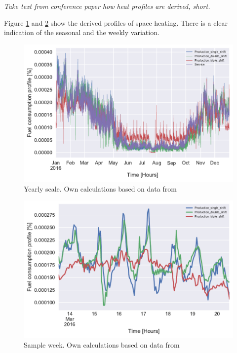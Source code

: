 \documentclass[review]{elsarticle}
\begin{document}
\textit{Take text from conference paper how heat profiles are derived, short.}

Figure \ref{fig:heat_space_year} and \ref{fig:heat_space_week} show the derived profiles of space heating. There is a clear indication of the seasonal and the weekly variation.

\begin{figure}[H]
\centering
\includegraphics[width=\linewidth]{Img/profiles/heatprofile_space_year_perc.pdf}
\caption{Yearly scale. Own calculations based on data from \cite{DanskGasDistribution2016,VM2015}}
\label{fig:heat_space_year}
\end{figure}
	
\begin{figure}[H]
\centering
\includegraphics[width=\linewidth]{Img/profiles/heatprofile_space_week_perc_noserv.pdf}
\caption{Sample week. Own calculations based on data from \cite{DanskGasDistribution2016,VM2015}}
\label{fig:heat_space_week}
\end{figure}
\end{document}
